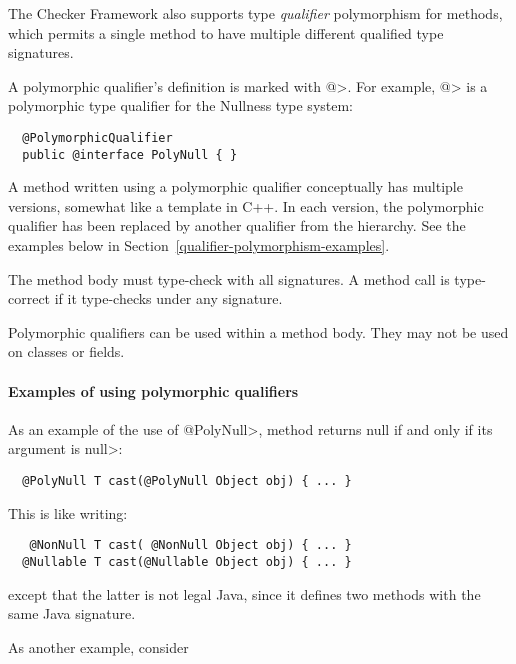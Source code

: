 The Checker Framework also supports type \emph{qualifier} polymorphism for methods,
which permits a single method to have multiple different qualified type
signatures.

A polymorphic qualifier's definition is marked with
\<@>.  For example, 
\<@> is a polymorphic type
qualifier for the Nullness type system:

\begin{Verbatim}
  @PolymorphicQualifier
  public @interface PolyNull { }
\end{Verbatim}

A method written using a polymorphic qualifier conceptually has multiple
versions, somewhat like a template in C++.  In each version, the
polymorphic qualifier has been replaced by another qualifier from the
hierarchy.  See the examples below in Section~\ref{qualifier-polymorphism-examples}.

The method body must type-check with all signatures.  A method call is
type-correct if it type-checks under any signature.

Polymorphic qualifiers can be used within a method body.  They may not be
used on classes or fields.


\paragraph{Examples of using polymorphic qualifiers\label{qualifier-polymorphism-examples}}

As an example of the use of \<@PolyNull>, method 
returns null if and only if its argument is \<null>:

\begin{Verbatim}
  @PolyNull T cast(@PolyNull Object obj) { ... }
\end{Verbatim}

\noindent
This is like writing:

\begin{Verbatim}
   @NonNull T cast( @NonNull Object obj) { ... }
  @Nullable T cast(@Nullable Object obj) { ... }
\end{Verbatim}

\noindent
except that the latter is not legal Java, since it defines two
methods with the same Java signature.


As another example, consider


